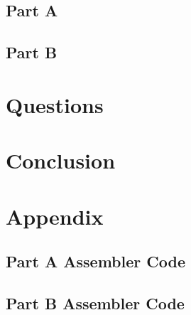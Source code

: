 \documentclass[10pt, letterpaper, titlepage]{article} %
\begin{document}
\begin{multicols*}{2}
\subsection{Part A}

\subsection{Part B}


\section{Questions}


\section{Conclusion}


\section{Appendix}
\subsection{Part A Assembler Code}

\subsection{Part B Assembler Code}



\end{multicols*}
\end{document}
